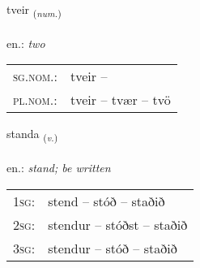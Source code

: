 \documentclass[frontgrid, backgrid]{flacards}\usepackage[]{graphicx}\usepackage[]{xcolor}
\begin{document}
\renewcommand{\flhead}{\vskip5pt \fboxsep=0pt {\small\bfseries\footnotesize Töluorð | Numeral}}
\renewcommand{\fcfoot}{\vskip5pt \fboxsep=0pt \hspace{2pt}{\small\bfseries\footnotesize 1K}}

\renewcommand{\blhead}{\vskip5pt {\small\bfseries\footnotesize Töluorð | Numeral }}
\renewcommand{\bcfoot}{\vskip5pt \hspace{2pt}{\small\bfseries\footnotesize 1K}}


{tveir \small{\textsubscript{(\textit{num.})}} \\[1ex] %
\textphonetic{[tʰveiːr]} \\
en.: \emph{two} \\  [2ex]
\renewcommand*{\arraystretch}{0.8}
\begin{tabular}{ll}
\textsc{sg.nom.}: & tveir  -- \\ 
\textsc{pl.nom.}: & tveir -- tvær -- tvö
\end{tabular}
}

\renewcommand{\flhead}{\vskip5pt \fboxsep=0pt {\small\bfseries\footnotesize Sagnorð | Verb}}
\renewcommand{\fcfoot}{\vskip5pt \fboxsep=0pt \hspace{2pt}{\small\bfseries\footnotesize 1K}}

\renewcommand{\blhead}{\vskip5pt {\small\bfseries\footnotesize Sagnorð | Verb }}
\renewcommand{\bcfoot}{\vskip5pt \hspace{2pt}{\small\bfseries\footnotesize 1K}}


{standa \small{\textsubscript{(\textit{v.})}} \\[1ex] %
\textphonetic{[stanta]} \\
en.: \emph{stand; be written} \\  [2ex]
\renewcommand*{\arraystretch}{0.8}
\begin{tabular}{p{1cm}l}
\textsc{1sg}: & stend -- stóð -- staðið \\ 
\textsc{2sg}: & stendur -- stóðst -- staðið \\ 
\textsc{3sg}: & stendur -- stóð -- staðið \\ 
\end{tabular}
}
\end{document}
